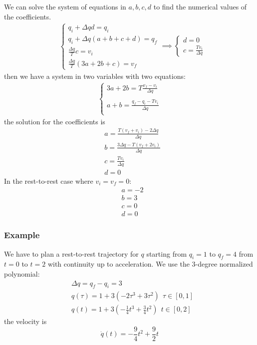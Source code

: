 \documentclass[10pt, letterpaper]{report}
\begin{document}
We can solve the system of equations in $a,b,c,d$ to find the numerical values of the coefficients.\begin{align}
    &\begin{cases}
        q_i+\Delta qd=q_i\\ 
        q_i+\Delta q(a+b+c+d)=q_f\\
        \frac{\Delta q}{T}c=v_i\\ 
        \frac{\Delta q}{T}\left({3a}+{2b}+{c}\right)=v_f
    \end{cases}\implies\begin{cases}
        d=0\\
        c=\frac{Tv_i}{\Delta q}
    \end{cases}
\end{align}
then we have a system in two variables with two equations:\begin{align}
    \begin{cases}
        \displaystyle 3a+2b=T\frac{v_f-v_i}{\Delta q}\\ \\
        \displaystyle a+b=\frac{q_f-q_i-Tv_i}{\Delta q}\\
    \end{cases}
\end{align}
the solution for the coefficients is\begin{align}
&a = \frac{T(v_f + v_i) - 2\Delta q}{\Delta q} \\ 
&b = \frac{3\Delta q - T(v_f + 2v_i)}{\Delta q}\\ 
&c=\frac{Tv_i}{\Delta q}\\ &d=0
\end{align}
In the rest-to-rest case where $v_i=v_f=0$:\begin{align}
&a = -2 \\ 
&b = 3\\ 
&c=0\\ &d=0
\end{align}
\subsubsection{Example}
We have to plan a rest-to-rest trajectory for $q$ starting from $q_i=1$ to $q_f=4$ from $t=0$ to $t=2$ with continuity up to acceleration. We use the 3-degree normalized polynomial:\begin{align}
    &\Delta q=q_f-q_i=3\\ 
    &q(\tau)=1+3(-2\tau^3+3\tau^2) \ \ \tau\in [0,1]\\ 
    &q(t)=1+3\left(-\frac{1}{4}t^3+\frac{3}{4}t^2\right) \ \ t\in[0,2]
\end{align} 
the velocity is\begin{equation}
   \dot q(t)= -\frac{9}{4}t^2+\frac{9}{2}t
\end{equation}
\end{document}
